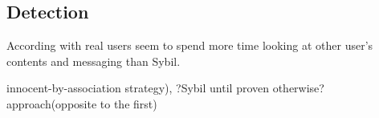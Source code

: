 \documentclass[twoside]{article}
\begin{document}
\begin{multicols}{2}

\section{Detection}
According with \cite{ferrara:2015} real users seem to spend more time looking at other user's contents and messaging than Sybil.

innocent-by-association strategy), ?Sybil until proven otherwise? approach(opposite to the first)\cite{ferrara:2015}











\end{multicols}
\end{document}
